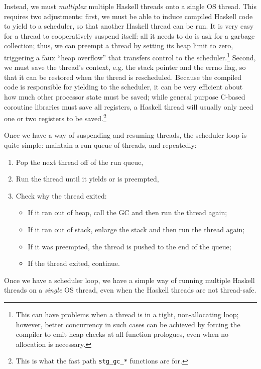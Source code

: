 Instead, we must \emph{multiplex} multiple Haskell threads onto a single
OS thread.  This requires two adjustments: first, we must be able to
induce compiled Haskell code to yield to a scheduler, so that another
Haskell thread can be run.  It is very easy for a thread to
cooperatively suspend itself: all it needs to do is ask for a garbage
collection; thus, we can preempt a thread by setting its heap limit to
zero, triggering a faux ``heap overflow'' that transfers control to the
scheduler.\footnote{This can have problems when a thread is in a tight,
    non-allocating loop; however, better concurrency in such cases can
be achieved by forcing the compiler to emit heap checks at all function
prologues, even when no allocation is necessary.}
Second, we must save the thread's context, e.g. the stack pointer and
the errno flag, so that it can be restored when the thread is
rescheduled.  Because the compiled code is responsible for yielding to
the scheduler, it can be very efficient about how much other processor
state must be saved; while general purpose C-based coroutine libraries
must save all registers, a Haskell thread will usually only need
one or two registers to be saved.\footnote{This is what the fast path \texttt{stg\_gc\_*} functions are for.}

Once we have a way of suspending and resuming threads, the scheduler
loop is quite simple: maintain a run queue of threads, and repeatedly:

\begin{enumerate}
    \item Pop the next thread off of the run queue,
    \item Run the thread until it yields or is preempted,
    \item Check why the thread exited:
        \begin{itemize}
            \item If it ran out of heap, call the GC and then run the thread again;
            \item If it ran out of stack, enlarge the stack and then run the thread again;
            \item If it was preempted, the thread is pushed to the end of the queue;
            \item If the thread exited, continue.
        \end{itemize}
\end{enumerate}

Once we have a scheduler loop, we have a simple way of running multiple
Haskell threads on a \emph{single} OS thread, even when the Haskell
threads are not thread-safe.

